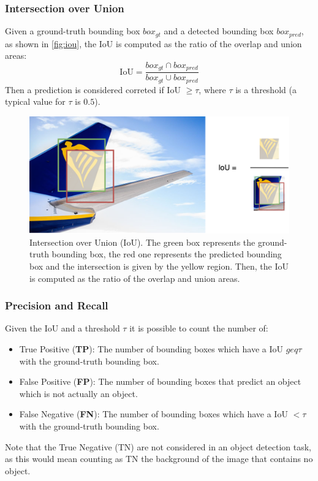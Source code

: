 \subsubsection{Intersection over Union}
Given a ground-truth bounding box $box_{gt}$ and a detected bounding box $box_{pred}$, as shown in \autoref{fig:iou}, the IoU is computed as the ratio of the overlap and union areas:
\begin{equation}
    \text{IoU} = \frac{box_{gt} \cap box_{pred}}{box_{gt} \cup box_{pred}} 
\end{equation}
Then a prediction is considered correted if IoU $ \geq \tau$, where $\tau$ is a threshold (a typical value for $\tau$ is $0.5$).

\begin{figure}[H]
	\centering
    \includegraphics[width=1\textwidth]{images/iou.drawio.png}
	\caption{Intersection over Union (IoU). The green box represents the ground-truth bounding box, the red one represents the predicted bounding box and the intersection is given by the yellow region. Then, the IoU is computed as the ratio of the overlap and union areas.}
	\label{fig:iou}
\end{figure}

\subsubsection{Precision and Recall}
Given the IoU and a threshold $\tau$ it is possible to count the number of:
\begin{itemize}
    \item True Positive (\textbf{TP}): The number of bounding boxes which have a IoU $geq \tau$ with the ground-truth bounding box.
    \item False Positive (\textbf{FP}): The number of bounding boxes that predict an object which is not actually an object.
    \item False Negative (\textbf{FN}): The number of bounding boxes which have a IoU $< \tau$ with the ground-truth bounding box.
\end{itemize}
Note that the True Negative (TN) are not considered in an object detection task, as this would mean counting as TN the background of the image that contains no object.


